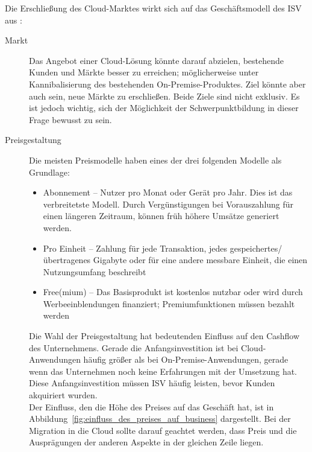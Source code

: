 Die Erschließung des Cloud-Marktes wirkt sich auf das Geschäftsmodell des ISV 
aus :
\begin{description}
	\item[Markt] Das Angebot einer Cloud-Lösung könnte darauf abzielen,
bestehende Kunden und Märkte besser zu erreichen; möglicherweise unter
Kannibalisierung des bestehenden On-Premise-Produktes. Ziel könnte aber auch
sein, neue Märkte zu erschließen. Beide Ziele sind nicht exklusiv. Es ist
jedoch wichtig, sich der Möglichkeit der Schwerpunktbildung in dieser Frage
bewusst zu sein.
	\item[Preisgestaltung] Die meisten Preismodelle haben eines der drei 
folgenden Modelle als Grundlage:
	\begin{itemize}
		\item Abonnement -- Nutzer pro Monat oder Gerät pro Jahr. Dies
ist das verbreitetste Modell. Durch Vergünstigungen bei Vorauszahlung für einen
längeren Zeitraum, können früh höhere Umsätze generiert werden.
		\item Pro Einheit -- Zahlung für jede Transaktion, jedes
gespeichertes/übertragenes Gigabyte oder für eine andere messbare Einheit, die
einen Nutzungsumfang beschreibt
		\item Free(mium) -- Das Basisprodukt ist kostenlos nutzbar oder
wird durch Werbeeinblendungen finanziert; Premiumfunktionen müssen bezahlt
werden
	\end{itemize}
	Die Wahl der Preisgestaltung hat bedeutenden Einfluss auf den Cashflow
des Unternehmens. Gerade die Anfangsinvestition ist bei Cloud-Anwendungen 
häufig größer als bei On-Premise-Anwendungen, gerade wenn das Unternehmen noch 
keine Erfahrungen mit der Umsetzung hat. Diese Anfangsinvestition müssen ISV 
häufig leisten, bevor Kunden akquiriert wurden. \\
Der Einfluss, den die Höhe des Preises auf das Geschäft hat, ist in
Abbildung~\ref{fig:einfluss_des_preises_auf_business} dargestellt. Bei der
Migration in die Cloud sollte darauf geachtet werden, dass Preis und die
Ausprägungen der anderen Aspekte in der gleichen Zeile liegen.

\end{description}
